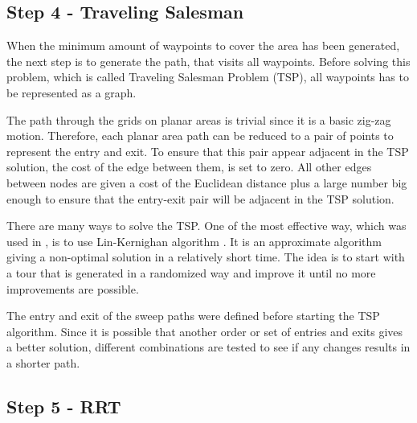 

\subsection{Step 4 - Traveling Salesman}
When the minimum amount of waypoints to cover the area has been generated, the next step is to generate the path, that visits all waypoints. Before solving this problem, which is called Traveling Salesman Problem (TSP), all waypoints has to be represented as a graph.

The path through the grids on planar areas is trivial since it is a basic zig-zag motion. Therefore, each planar area path can be reduced to a pair of points to represent the entry and exit. To ensure that this pair appear adjacent in the TSP solution, the cost of the edge between them, is set to zero. All other edges between nodes are given a cost of the Euclidean distance plus a large number big enough to ensure that the entry-exit pair will be adjacent in the TSP solution.

There are many ways to solve the TSP. One of the most effective way, which was used in \cite{6386126}, is to use Lin-Kernighan algorithm \cite{Helsgaun00aneffective}. It is an approximate algorithm giving a non-optimal solution in a relatively short time. The idea is to start with a tour that is generated in a randomized way and improve it until no more improvements are possible. 


The entry and exit of the sweep paths were defined before starting the TSP algorithm. Since it is possible that another order or set of entries and exits gives a better solution, different combinations are tested to see if any changes results in a shorter path.

\subsection{Step 5 - RRT}

